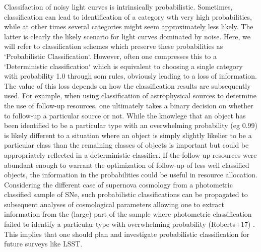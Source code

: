 Classifaction of noisy light curves is intrinsically probabilistic. Sometimes, classification can lead to identification of a category wth very high probabilities, while at other times several categories might seem approximately 
less likely. The latter is clearly the likely scenario for light curves dominated by noise.
Here, we will refer to classification schemes which preserve these probabilities as `Probabilistic Classification`.
However, often one compresses this to a  
 `Deterministic classification` which is equivalent to choosing a single category with probability 1.0 through som 
rules, obviously leading to a loss of information. The value of this loss depends on how the classification results are subsequently used. For example, when using classification of astrophysical sources to determine the use of follow-up resources, one ultimately takes a binary decision on whether to follow-up a particular source or not. While the knowlege that an object has been identified to be a particular type with an overwhelming probability (eg 0.99) is likely different to a situation where an object is simply slightly likelier to be a particular class than the remaining classes of objects is important but could be appropriately reflected in a deterministic classifier. If the follow-up resources were abundant enough to warrant the optimization of follow-up of less well classified objects,  the information in the probabilities could be useful in resource allocation. Considering the different case of supernova cosmology from a photometric classified sample of SNe, such probabilistic classifications can be propagated to subsequent analyses of cosmological parameters allowing one to extract information from the (large) part of the sample where photometric classification failed to identify a particular type with overwhelming probability (Roberts+17) . This implies that one should plan and investigate probabilistic classification for future surveys like LSST. 

